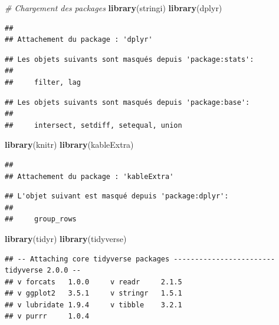 \documentclass[
]{article}
\author{}
\date{\vspace{-2.5em}}
\newenvironment{Shaded}{\begin{snugshade}}{\end{snugshade}}
\newcommand{\CommentTok}[1]{\textcolor[rgb]{0.56,0.35,0.01}{\textit{#1}}}
\newcommand{\FunctionTok}[1]{\textcolor[rgb]{0.13,0.29,0.53}{\textbf{#1}}}
\newcommand{\NormalTok}[1]{#1}
\begin{document}
\begin{Shaded}
\begin{Highlighting}[]
\CommentTok{\# Chargement des packages}
\FunctionTok{library}\NormalTok{(stringi)}
\FunctionTok{library}\NormalTok{(dplyr)}
\end{Highlighting}
\end{Shaded}

\begin{verbatim}
## 
## Attachement du package : 'dplyr'
\end{verbatim}

\begin{verbatim}
## Les objets suivants sont masqués depuis 'package:stats':
## 
##     filter, lag
\end{verbatim}

\begin{verbatim}
## Les objets suivants sont masqués depuis 'package:base':
## 
##     intersect, setdiff, setequal, union
\end{verbatim}

\begin{Shaded}
\begin{Highlighting}[]
\FunctionTok{library}\NormalTok{(knitr)}
\FunctionTok{library}\NormalTok{(kableExtra)}
\end{Highlighting}
\end{Shaded}

\begin{verbatim}
## 
## Attachement du package : 'kableExtra'
\end{verbatim}

\begin{verbatim}
## L'objet suivant est masqué depuis 'package:dplyr':
## 
##     group_rows
\end{verbatim}

\begin{Shaded}
\begin{Highlighting}[]
\FunctionTok{library}\NormalTok{(tidyr)}
\FunctionTok{library}\NormalTok{(tidyverse)}
\end{Highlighting}
\end{Shaded}

\begin{verbatim}
## -- Attaching core tidyverse packages ------------------------ tidyverse 2.0.0 --
## v forcats   1.0.0     v readr     2.1.5
## v ggplot2   3.5.1     v stringr   1.5.1
## v lubridate 1.9.4     v tibble    3.2.1
## v purrr     1.0.4
\end{verbatim}
\end{document}
